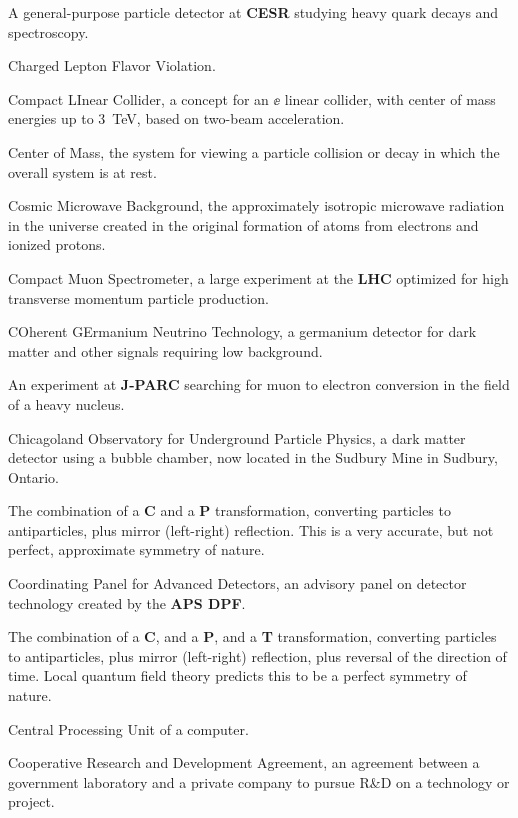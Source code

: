  A general-purpose particle detector at {\bf CESR}  studying heavy quark 
decays and spectroscopy.

 Charged Lepton Flavor Violation.

 Compact LInear Collider, a concept for an $\ee$ 
linear collider, with center of mass energies up to 3~TeV, based on 
two-beam acceleration.

 Center of Mass, the system for viewing a particle collision
or decay in which the overall system is at rest.

 Cosmic Microwave Background, the approximately
isotropic microwave radiation in the universe created in the original
formation of atoms from electrons and ionized protons. 

 Compact Muon Spectrometer, a large experiment at the 
{\bf LHC} optimized for high transverse momentum 
particle production.

  COherent GErmanium Neutrino Technology, a germanium
detector for dark matter and other signals requiring low background.

  An experiment at {\bf J-PARC} searching for muon
 to electron conversion in the field of a heavy nucleus.

 Chicagoland Observatory for Underground Particle
Physics, a dark matter detector using a bubble chamber, now located
in the Sudbury Mine in Sudbury, Ontario.

 The combination of a {\bf C} and a {\bf P} transformation, 
converting particles to antiparticles, plus mirror (left-right) reflection.
This is a very accurate, but not perfect, approximate symmetry of nature.

 Coordinating Panel for Advanced Detectors, an
advisory panel on detector technology created by the {\bf APS DPF}.

  The combination of a {\bf C},  and a {\bf P}, and a 
{\bf T}  transformation, 
converting particles to antiparticles, plus mirror (left-right)
reflection, plus reversal of the direction of time.   Local quantum 
field theory predicts this to be a perfect symmetry of nature.

  Central Processing Unit of a computer.


 Cooperative Research and Development Agreement, an 
agreement between a government laboratory and a private company to 
pursue R\&D on a technology or project.

